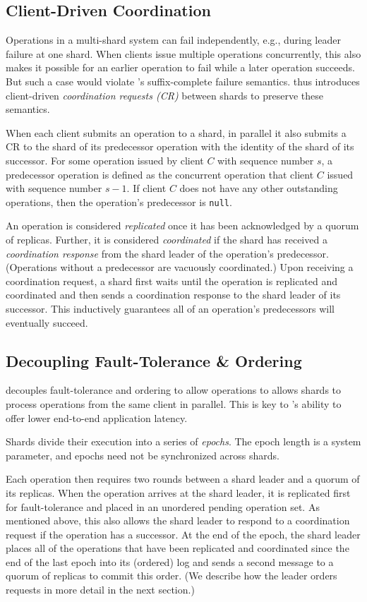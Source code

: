 \subsection{Client-Driven Coordination}

Operations in a multi-shard system can fail independently, e.g., during leader failure at one shard. 
When clients issue multiple operations
concurrently, this also makes it possible for an earlier operation to fail while a later
operation succeeds. But such a case would violate \MDL{}'s suffix-complete failure semantics.  
\sys{} thus introduces client-driven \textit{coordination requests (CR)} between shards to preserve these semantics.

When each client submits an operation to a shard, in parallel it also submits a CR
to the shard of its predecessor operation with the identity of the shard of its successor.
For some operation issued by client $C$
with sequence number $s$, a predecessor operation is defined as the concurrent
operation that client $C$ issued with sequence number $s-1$. If client $C$ does not
have any other outstanding operations, then the operation's predecessor is
\texttt{null}.

An operation is considered \textit{replicated} once it has been acknowledged by a
quorum of replicas. Further, it is considered \textit{coordinated} if the shard has
received a \textit{coordination response} from the shard leader of the operation's predecessor.
(Operations without a predecessor are vacuously coordinated.)
Upon receiving a coordination request, a shard first waits until the operation is
replicated and coordinated and then sends a coordination response to the shard leader
of its successor. This inductively guarantees all of an operation's predecessors will
eventually succeed.

\subsection{Decoupling Fault-Tolerance \& Ordering}

\sys{} decouples fault-tolerance and ordering to allow operations to allows shards to process operations
from the same client in parallel. This is key to \sys{}'s ability to offer lower end-to-end application
latency.

Shards divide their execution into a series of \textit{epochs}. The epoch length is a system parameter,
and epochs need not be synchronized across shards.

Each operation then requires two rounds between a shard leader and a quorum of its replicas.
When the operation arrives at the shard leader, it is replicated first for fault-tolerance
and placed in an unordered pending operation set. As mentioned above, this also allows the shard
leader to respond to a coordination request if the operation has a successor. At the end of the epoch,
the shard leader places all of the operations that have been replicated and coordinated
since the end of the last epoch into its (ordered) log and sends a second message to a quorum of
replicas to commit this order. (We describe how the leader orders requests in more detail in the next
section.)

